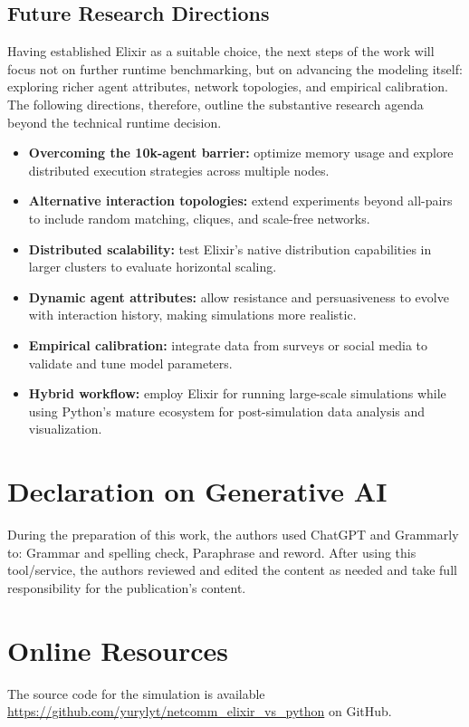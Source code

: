 \documentclass[
]{ceurart}
\begin{document}
\subsection{Future Research Directions}
Having established Elixir as a suitable choice, the next steps of the work will focus not on further runtime benchmarking, but on advancing the modeling itself: exploring richer agent attributes, network topologies, and empirical calibration. The following directions, therefore, outline the substantive research agenda beyond the technical runtime decision.
\begin{itemize}
	\item \textbf{Overcoming the 10k-agent barrier:} optimize memory usage and explore distributed execution strategies across multiple nodes.
	\item \textbf{Alternative interaction topologies:} extend experiments beyond all-pairs to include random matching, cliques, and scale-free networks.
	\item \textbf{Distributed scalability:} test Elixir’s native distribution capabilities in larger clusters to evaluate horizontal scaling.
	\item \textbf{Dynamic agent attributes:} allow resistance and persuasiveness to evolve with interaction history, making simulations more realistic.
	\item \textbf{Empirical calibration:} integrate data from surveys or social media to validate and tune model parameters.
    \item \textbf{Hybrid workflow:} employ Elixir for running large-scale simulations while using Python’s mature ecosystem for post-simulation data analysis and visualization.
\end{itemize}


\section*{Declaration on Generative AI}  
 During the preparation of this work, the authors used ChatGPT and Grammarly to: Grammar and spelling check, Paraphrase and reword. After using this tool/service, the authors reviewed and edited the content as needed and take full responsibility for the publication’s content.



\appendix

\section{Online Resources}
The source code for the simulation is available \url{https://github.com/yurylyt/netcomm_elixir_vs_python} on GitHub. 
\end{document}
